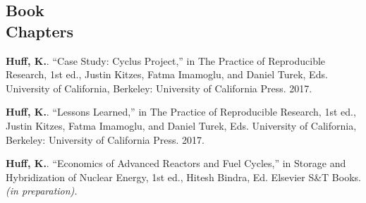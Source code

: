 \documentclass[margin,line]{resume}
\begin{document}
\begin{resume}
    \section{\mysidestyle Book\\Chapters}
      \begin{bibenum} 
      \item \textbf{Huff, K.}. ``Case Study: Cyclus Project,'' in The Practice 
              of Reproducible Research, 1st ed., Justin Kitzes, Fatma Imamoglu, 
              and Daniel Turek, Eds. University of California, Berkeley: 
              University of California Press. 2017.
      \item \textbf{Huff, K.}. ``Lessons Learned,'' in The Practice of Reproducible 
              Research, 1st ed., Justin Kitzes, Fatma Imamoglu, and Daniel 
              Turek, Eds. University of California, Berkeley: University of 
              California Press. 2017.
      \item \textbf{Huff, K.}. ``Economics of Advanced Reactors and Fuel 
              Cycles,'' in Storage and Hybridization of Nuclear Energy, 1st 
              ed., Hitesh Bindra, Ed. Elsevier S\&T Books.\textsl{(in 
              preparation).}
      \end{bibenum}


\end{resume}
\end{document}
